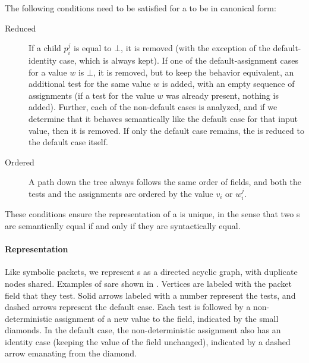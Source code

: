 \documentclass[acmsmall,dvipsnames,nonacm]{acmart}
\begin{document}
The following conditions need to be satisfied for a \SPPn{} to be in canonical form:

\begin{description}
    \item[Reduced] If a child $p_i^j$ is equal to $\bot$, it is removed (with the exception of the default-identity case, which is always kept).
    If one of the default-assignment cases for a value $w$ is $\bot$, it is removed, but to keep the behavior equivalent, an additional test for the same value $w$ is added, with an empty sequence of assignments (if a test for the value $w$ was already present, nothing is added).
    Further, each of the non-default cases is analyzed, and if we determine that it behaves semantically like the default case for that input value, then it is removed.
    If only the default case remains, the \SPPn{} is reduced to the default case itself.
    \item[Ordered] A path down the tree always follows the same order of fields, and both the tests and the assignments are ordered by the value $v_i$ or $w_i^j$.
\end{description}

These conditions ensure the representation of a \SPPn{} is unique, in the sense that two \SPPn{}s are semantically equal if and only if they are syntactically equal.

\paragraph{Representation}
Like symbolic packets, we represent \SPPn{}s as a directed acyclic graph, with duplicate nodes shared.
Examples of \SPPn{}sare shown in .
Vertices are labeled with the packet field that they test.
Solid arrows labeled with a number represent the tests, and dashed arrows represent the default case.
Each test is followed by a non-deterministic assignment of a new value to the field, indicated by the small diamonds.
In the default case, the non-deterministic assignment also has an identity case (keeping the value of the field unchanged), indicated by a dashed arrow emanating from the diamond.

\end{document}
